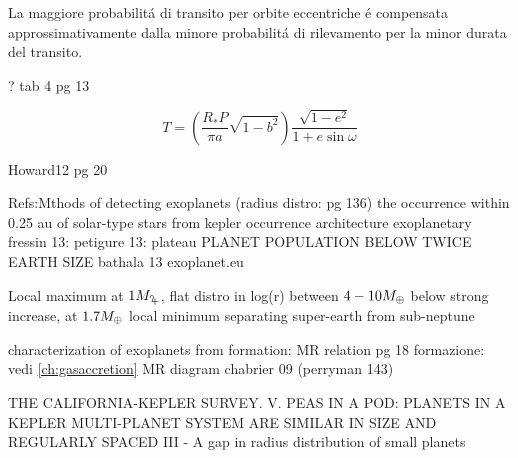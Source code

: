 \begin{workout}
	La maggiore probabilit\'a di transito per orbite eccentriche \'e compensata approssimativamente dalla minore probabilit\'a di rilevamento per la minor durata del transito.
\end{workout}

\begin{workout}
	?
	tab 4 pg 13
\end{workout}

\begin{workout}
\[T=(\frac{R_*P}{\pi a}\sqrt{1-b^2})\frac{\sqrt{1-e^2}}{1+e\sin{\omega}}\]
\end{workout}

\begin{workout}
Howard12 pg 20
\end{workout}

\begin{workout}
Refs:Mthods of detecting exoplanets (radius distro: pg 136)
the occurrence within 0.25 au of solar-type stars from kepler
occurrence architecture exoplanetary
fressin 13: 
petigure 13: plateau PLANET POPULATION BELOW TWICE EARTH SIZE
bathala 13
exoplanet.eu
\end{workout}

\begin{workout}
Local maximum at $1\mjupiter{}$, flat distro in log(r) between $4-10M_{\oplus}{}$ below strong increase, at $1.7M_{\oplus}{}$ local minimum separating super-earth from sub-neptune
\end{workout}

\begin{workout}
characterization of exoplanets from formation: MR relation pg 18
formazione: vedi \ref{ch:gasaccretion}
MR diagram chabrier 09 (perryman 143)
\end{workout}

\begin{workout}
THE CALIFORNIA-KEPLER SURVEY. V. PEAS IN A POD: PLANETS IN A KEPLER MULTI-PLANET SYSTEM ARE SIMILAR IN SIZE AND REGULARLY SPACED
III - A gap in radius distribution of small planets
\end{workout}

